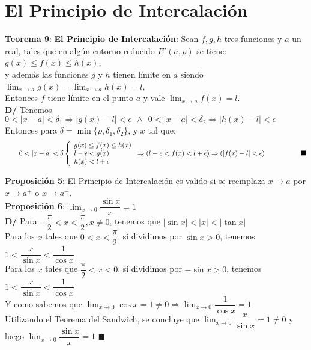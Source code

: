 \documentclass[11pt,a4paper]{article}
\newcommand*{\QEDA}{\null\nobreak\hfill\ensuremath{\blacksquare}}
\begin{document}
\section{El Principio de Intercalaci\'on}
\noindent \textbf{Teorema 9}: \textbf{El Principio de Intercalaci\'on}: Sean $f,g,h$ tres funciones y $a$ un real, tales que en alg\'un entorno reducido $E'(a, \rho)$ se tiene: $g(x) \leq f(x) \leq h(x)$,\\
y adem\'as las funciones $g$ y $h$ tienen l\'imite en $a$ siendo $\displaystyle{\lim_{x\to a} g(x) = \lim_{x\to a} h(x) = l}$,\\
Entonces $f$ tiene l\'imite en el punto $a$ y vale $\displaystyle{\lim_{x\to a} f(x)=l}.$\\
\noindent \textbf{D/} Tenemos $0<|x-a|<\delta_1 \Rightarrow|g(x)-l| < \epsilon \ \ \land \ \ 0<|x-a|<\delta_2 \Rightarrow |h(x) - l| < \epsilon$\\
Entonces para $\delta = \min\{\rho, \delta_1, \delta_2\}$, y $x$ tal que:
\[\ \ \ \ \ \ 0 < |x-a| < \delta \left\{\begin{array}{l}
g(x) \leq f(x) \leq h(x)\\
l - \epsilon < g(x)\\
h(x) < l + \epsilon
\end{array}\right. \Rightarrow (l - \epsilon < f(x) < l + \epsilon) \Rightarrow (|f(x) - l| < \epsilon)\ \ \ \ \ \ \ \ \ \ \ \ \ \ \ \ \QEDA\\ \\ \] 

\vspace{.5cm}

\noindent \textbf{Proposici\'on 5}: El Principio de Intercalaci\'on es valido si se reemplaza $x\rightarrow a$ por $x\rightarrow a^+$ o $x\rightarrow a^-$.\\

\noindent \textbf{Proposici\'on 6}: $\displaystyle{\lim_{x \to 0} \dfrac{\sin x}{x} = 1}$\\
\noindent \textbf{D/} Para $-\dfrac{\pi}{2} < x < \dfrac{\pi}{2}, x \not = 0$, tenemos que $|\sin x| < |x| < |\tan x|$\\
Para los $x$ tales que $0 < x < \dfrac{\pi}{2}$, si dividimos por $\sin x > 0$, tenemos $1 < \dfrac{x}{\sin x} < \dfrac{1}{\cos x}$\\
Para los $x$ tales que $\dfrac{\pi}{2} < x < 0$, si dividimos por $-\sin x > 0$, tenemos $1 < \dfrac{x}{\sin x} < \dfrac{1}{\cos x}$\\
Y como sabemos que $\displaystyle{\lim_{x \to 0} \cos x = 1} \not = 0 \Rightarrow \displaystyle{\lim_{x \to 0} \dfrac{1}{\cos x} = 1}$\\
Utilizando el Teorema del Sandwich, se concluye que $\displaystyle{\lim_{x \to 0} \dfrac{x}{\sin x} = 1 \not = 0}$ y luego $\displaystyle{\lim_{x \to 0} \dfrac{\sin x}{x} = 1}$
\QEDA\\ \\
\end{document}

